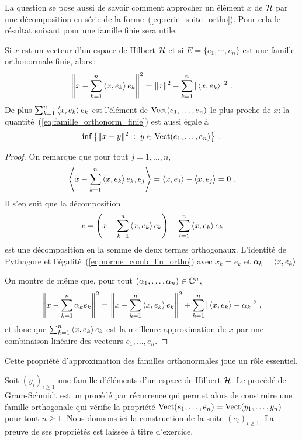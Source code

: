 La question se pose aussi de savoir comment approcher un \'{e}l\'{e}ment $x$ de $\mathcal{H}$
par une d\'{e}composition en s\'{e}rie de la forme~(\ref{eq:serie_suite_ortho}).
Pour cela le r\'{e}sultat suivant pour une famille finie sera utile.
\begin{proposition}
\label{prop:bessel}
Si $x$ est un vecteur d'un espace de Hilbert $\mathcal{H}$ et si
$E=\{e_1,\cdots,e_n\}$ est une famille orthonormale finie, alors\,:
\begin{equation}
  \label{eq:famille_orthonorm_finie}
\left\| x-\sum_{k=1}^n \left\langle x, e_k \right\rangle e_k \right\|^2= \|x\|^2 - \sum_{k=1}^n |\left\langle x, e_k \right\rangle|^2\;.
\end{equation}
De plus
$\sum_{k=1}^n \left\langle x, e_k \right\rangle e_k$ est l'\'{e}l\'{e}ment de
$\mathrm{Vect}(e_1,\dots,e_n)$ le plus proche de $x$: la
quantit\'{e}~(\ref{eq:famille_orthonorm_finie}) est aussi \'{e}gale \`{a}
$$
\inf\left\{\|x-y\|^2 \;:\;y \in\mathrm{Vect}(e_1,\dots,e_n)\right\}\;.
$$
\end{proposition}
\begin{proof}
On remarque que pour tout $j=1,\dots,n$,
$$
\left\langle x-\sum_{k=1}^n \left\langle x, e_k \right\rangle e_k, e_j \right\rangle=\left\langle x, e_j \right\rangle-\left\langle x, e_j \right\rangle=0\;.
$$
Il s'en suit que la d\'{e}composition
$$
x=\left(x-\sum_{k=1}^n \left\langle x, e_k \right\rangle e_k\right)+\sum_{i=1}^n \left\langle x, e_k \right\rangle e_k
$$
est une d\'{e}composition en la somme de deux termes orthogonaux. L'identit\'{e} de
Pythagore et l'\'{e}galit\'{e}~(\ref{eq:norme_comb_lin_ortho}) avec $x_k=e_k$ et
$\alpha_k=\left\langle x, e_k \right\rangle$

On montre de m\^{e}me que, pour tout  $(\alpha_1,\dots,\alpha_n) \in \mathbb{C}^n$,
$$
\left\| x - \sum_{k=1}^n \alpha_k e_k \right\|^2=
\left\| x - \sum_{k=1}^n \left\langle x, e_k \right\rangle e_k \right\|^2 +
\sum_{k=1}^n |\left\langle x, e_k \right\rangle-\alpha_k|^2\;,
$$
et donc que $\sum_{k=1}^n \left\langle x, e_k \right\rangle e_k$ est la meilleure approximation de
$x$ par une combinaison lin\'{e}aire des vecteurs $e_1,\dots,e_n$.

\end{proof}
Cette propri\'{e}t\'{e}
d'approximation des familles orthonormales joue un r\^{o}le essentiel.
\begin{example}
\label{exple:gram-schmidt}
Soit $(y_i)_{i\geq1}$ une famille d'\'{e}l\'{e}ments d'un espace de Hilbert $\mathcal{H}$.
Le proc\'{e}d\'{e} de Gram-Schmidt est un proc\'{e}d\'{e} par r\'{e}currence qui permet alors de
construire une famille orthogonale
 qui v\'{e}rifie la propri\'{e}t\'{e}
$\mathrm{Vect}(e_1,\dots,e_n)=\mathrm{Vect}(y_1,\dots,y_n)$ pour tout $n\geq1$.
Nous donnons ici la construction de la suite $(e_i)_{i\geq1}$. La preuve de ses
propri\'{e}t\'{e}s est laiss\'{e}e \`{a} titre d'exercice.
\end{example}


